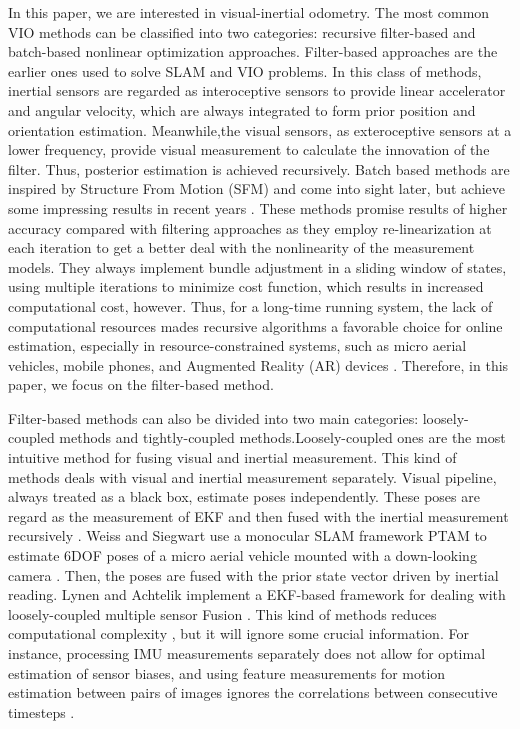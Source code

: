 \documentclass[a4paper, 10pt, conference]{ieeeconf}      %
\begin{document}
In this paper, we are interested in visual-inertial odometry. The most common VIO methods can be classified into two categories: recursive filter-based and batch-based nonlinear optimization approaches. Filter-based approaches are the earlier ones used to solve SLAM and VIO problems. In this class of methods, inertial sensors are regarded as interoceptive sensors to provide linear accelerator and angular velocity, which are always integrated to form prior position and orientation estimation. Meanwhile,the visual sensors, as  exteroceptive sensors at a lower frequency,  provide visual measurement to calculate the innovation of the filter. Thus, posterior estimation is achieved recursively. Batch based methods are inspired by Structure From Motion (SFM) \cite{triggs1999bundle} and come into sight later, but achieve some impressing results in recent years \cite{leutenegger2015keyframe} \cite{strasdat2010scale} \cite{mur2015orb}. These methods promise results of higher accuracy compared with filtering approaches as they employ re-linearization at each iteration to get a better deal with the nonlinearity of the measurement models. They always implement bundle adjustment in a sliding window of states, using multiple iterations to minimize cost function, which results in increased computational cost, however. Thus, for a long-time running system,  the lack of computational resources mades recursive algorithms a favorable choice for online estimation, especially in resource-constrained systems, such as micro aerial vehicles, mobile phones, and Augmented Reality (AR) devices \cite{li2014visual}. Therefore, in this paper, we focus on the filter-based method.

Filter-based methods can also be divided into two main categories: loosely-coupled methods and tightly-coupled methods.Loosely-coupled ones are the most intuitive method for fusing visual and inertial measurement. This kind of methods deals with visual and inertial  measurement separately. Visual pipeline, always treated as a black box, estimate poses independently. These poses are regard as the measurement of EKF and then fused with the inertial measurement recursively \cite{kleinert2010inertial}. Weiss and Siegwart use a monocular  SLAM framework PTAM to estimate 6DOF poses of a micro aerial vehicle mounted with a down-looking camera \cite{klein2007parallel} \cite{weiss2011real} . Then, the poses are fused with the prior state vector driven by inertial reading. Lynen and Achtelik implement a EKF-based framework  for dealing  with loosely-coupled multiple sensor Fusion \cite{lynen13robust}. This kind of methods reduces computational complexity , but it will ignore some crucial information. For instance, processing IMU measurements separately does not allow for optimal estimation of sensor biases, and using feature measurements for motion estimation between pairs of images ignores the correlations between consecutive timesteps \cite{mourikis2007multi}.
\end{document}
